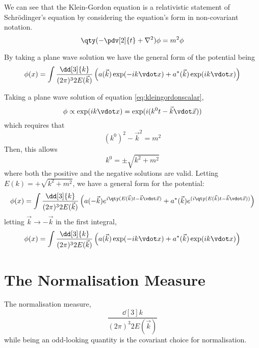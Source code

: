\documentclass[ebook, openany, oldfontcommands,twocolumn, 10pt]{momento}
\begin{document}
\begin{expl}
\begin{illustration} We can see that the Klein-Gordon equation is a
  relativistic statement of Schr\"odinger's equation by considering
  the equation's form in non-covariant notation.
  \begin{equation*}
    \label{eq:16} \qty( - \pdv[2]{t} + \nabla^2 ) \phi = m^2 \phi
  \end{equation*}
\end{illustration}

By taking a plane wave solution we have the general form of the
potential being
  \begin{dmath}
    \phi(x) = \int \frac{\dd[3]{k}}{(2 \pi)^3 2 E(\vec{k})} \left(
      a(\vec{k}) \exp(- i k \vdot x) + a^{*}(\vec{k}) \exp(i k \vdot
      x) \right)
  \end{dmath}

\begin{derivation}

  Taking a plane wave solution of equation \ref{eq:kleingordonscalar},
  \[ \phi \propto \exp(i k \vdot x) = \exp( i (k^0 t - \vec{k} \vdot
  \vec{x})) \] which requires that
  \[ (k^0)^2 - \vec{k}^2 = m^2 \] Then, this allows
  \begin{equation}
    \label{eq:17}
    k^0 = \pm \sqrt{k^2 + m^2}
  \end{equation}
  where both the positive and the negative solutions are
  valid. Letting $E(k)= + \sqrt{k^2 + m^2}$, we have a general form
  for the potential:
  \begin{dmath}
    \label{eq:18}
    \phi(x) = \int \frac{\dd[3]{k}}{(2 \pi)^3 2 E(\vec{k})} \left(
      a(-\vec{k}) e^{i\qty(E(\vec{k}) t - \vec{k} \vdot \vec{x})} +
      a^{*}(\vec{k}) e^{(i\qty(E(\vec{k}) t - \vec{k} \vdot \vec{x}))}
    \right)
  \end{dmath}
  letting $\vec{k} \to - \vec{k}$ in the first integral,
  \begin{dmath}
    \phi(x) = \int \frac{\dd[3]{k}}{(2 \pi)^3 2 E(\vec{k})} \left(
      a(\vec{k}) \exp(- i k \vdot x) + a^{*}(\vec{k}) \exp(i k \vdot
      x) \right)
  \end{dmath}
\end{derivation}

\section{The Normalisation Measure}
\label{sec:norm-meas}

The normalisation measure,
\[ \frac{\dd[3]{k}}{(2 \pi)^3 2 E(\vec{k})} \] 
while being an odd-looking quantity is the covariant choice
for normalisation. 


\end{expl}
\end{document}

